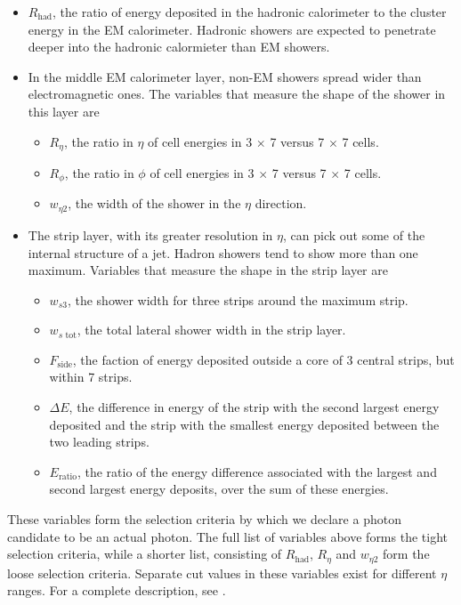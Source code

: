 \begin{itemize}
\item $R_\text{had}$, the ratio of energy deposited in the hadronic calorimeter to the cluster energy in the EM calorimeter. Hadronic showers are expected to penetrate deeper into the hadronic calormieter than EM showers.
\item In the middle EM calorimeter layer, non-EM showers spread wider than electromagnetic ones. The variables that measure the shape of the shower in this layer are
\begin{itemize}
\item $R_\eta$, the ratio in $\eta$ of cell energies in 3 $\times$ 7 versus 7 $\times$ 7 cells.
\item $R_\phi$, the ratio in $\phi$ of cell energies in 3 $\times$ 7 versus 7 $\times$ 7 cells.
\item $w_{\eta 2}$, the width of the shower in the $\eta$ direction.
\end{itemize}
\item The strip layer, with its greater resolution in $\eta$, can pick out some of the internal structure of a jet. Hadron showers tend to show more than one maximum. Variables that measure the shape in the strip layer are
\begin{itemize}
\item $w_{s3}$, the shower width for three strips around the maximum strip.
\item $w_{s\text{ tot}}$, the total lateral shower width in the strip layer.
\item $F_\text{side}$, the faction of energy deposited outside a core of 3 central strips, but within 7 strips.
\item $\Delta E$, the difference in energy of the strip with the second largest energy deposited and the strip with the smallest energy deposited between the two leading strips.
\item $E_\text{ratio}$, the ratio of the energy difference associated with the
largest and second largest energy deposits, over the sum of these energies.
\end{itemize}
\end{itemize}

These variables form the selection criteria by which we declare a photon candidate to be an actual photon. The full list of variables above forms the tight selection criteria, while a shorter list, consisting of $R_\text{had}$, $R_\eta$ and $w_{\eta2}$ form the loose selection criteria. Separate cut values in these variables exist for different $\eta$ ranges. For a complete description, see \cite{Carminati}.

